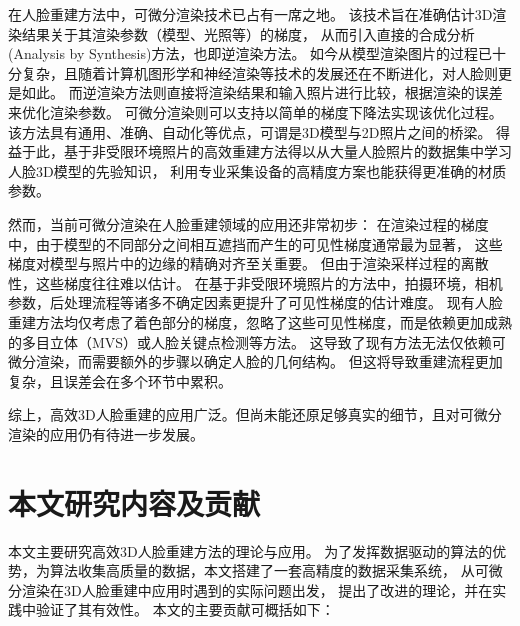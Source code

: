 在人脸重建方法中，可微分渲染技术已占有一席之地。
该技术旨在准确估计3D渲染结果关于其渲染参数（模型、光照等）的梯度，
从而引入直接的合成分析(Analysis by Synthesis)方法，也即逆渲染方法。
如今从模型渲染图片的过程已十分复杂，且随着计算机图形学和神经渲染等技术的发展还在不断进化，对人脸则更是如此。
而逆渲染方法则直接将渲染结果和输入照片进行比较，根据渲染的误差来优化渲染参数。
可微分渲染则可以支持以简单的梯度下降法实现该优化过程。
该方法具有通用、准确、自动化等优点，可谓是3D模型与2D照片之间的桥梁。
得益于此，基于非受限环境照片的高效重建方法得以从大量人脸照片的数据集中学习人脸3D模型的先验知识，
利用专业采集设备的高精度方案也能获得更准确的材质参数。

然而，当前可微分渲染在人脸重建领域的应用还非常初步：
在渲染过程的梯度中，由于模型的不同部分之间相互遮挡而产生的可见性梯度通常最为显著，
这些梯度对模型与照片中的边缘的精确对齐至关重要。
但由于渲染采样过程的离散性，这些梯度往往难以估计。
在基于非受限环境照片的方法中，拍摄环境，相机参数，后处理流程等诸多不确定因素更提升了可见性梯度的估计难度。
现有人脸重建方法均仅考虑了着色部分的梯度，忽略了这些可见性梯度，而是依赖更加成熟的多目立体（MVS）或人脸关键点检测等方法。
这导致了现有方法无法仅依赖可微分渲染，而需要额外的步骤以确定人脸的几何结构。
但这将导致重建流程更加复杂，且误差会在多个环节中累积。

综上，高效3D人脸重建的应用广泛。但尚未能还原足够真实的细节，且对可微分渲染的应用仍有待进一步发展。

\section{本文研究内容及贡献}

本文主要研究高效3D人脸重建方法的理论与应用。
为了发挥数据驱动的算法的优势，为算法收集高质量的数据，本文搭建了一套高精度的数据采集系统，
从可微分渲染在3D人脸重建中应用时遇到的实际问题出发，
提出了改进的理论，并在实践中验证了其有效性。
本文的主要贡献可概括如下：

